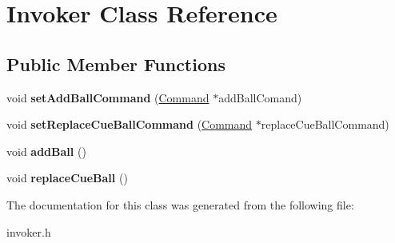 \hypertarget{class_invoker}{}\section{Invoker Class Reference}
\label{class_invoker}
\subsection*{Public Member Functions}
\begin{DoxyCompactItemize}
\item 
\mbox{\label{class_invoker_a83417cf5070cbb16a3ac5a039a52afa8}} 
void {\bfseries set\+Add\+Ball\+Command} (\mbox{\hyperlink{class_command}{Command}} $\ast$add\+Ball\+Comand)
\item 
\mbox{\label{class_invoker_a5799da615f2e9de819fe39bc00afb444}} 
void {\bfseries set\+Replace\+Cue\+Ball\+Command} (\mbox{\hyperlink{class_command}{Command}} $\ast$replace\+Cue\+Ball\+Command)
\item 
\mbox{\label{class_invoker_aa51dffd58ae9e0659e29431b7366c5a8}} 
void {\bfseries add\+Ball} ()
\item 
\mbox{\label{class_invoker_ab000c9319ec0e33defe1b922ca379268}} 
void {\bfseries replace\+Cue\+Ball} ()
\end{DoxyCompactItemize}


The documentation for this class was generated from the following file\+:\begin{DoxyCompactItemize}
\item 
invoker.\+h\end{DoxyCompactItemize}
